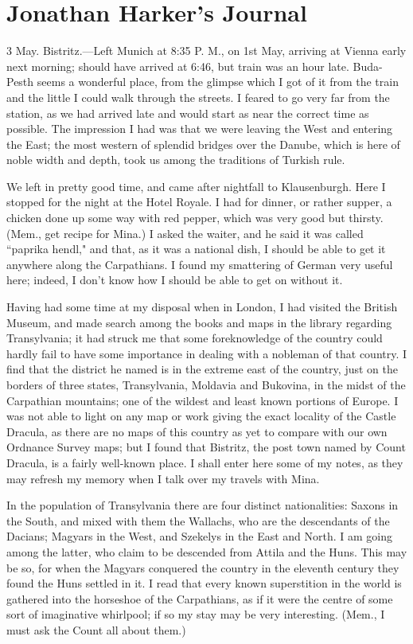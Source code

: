 \chapter{Jonathan Harker's Journal}

3 May. Bistritz.---Left Munich at 8:35 P. M., on 1st May, arriving at Vienna early next morning; should have arrived at 6:46, but train was an hour late. Buda-Pesth seems a wonderful place, from the glimpse which I got of it from the train and the little I could walk through the streets. I feared to go very far from the station, as we had arrived late and would start as near the correct time as possible. The impression I had was that we were leaving the West and entering the East; the most western of splendid bridges over the Danube, which is here of noble width and depth, took us among the traditions of Turkish rule.

We left in pretty good time, and came after nightfall to Klausenburgh. Here I stopped for the night at the Hotel Royale. I had for dinner, or rather supper, a chicken done up some way with red pepper, which was very good but thirsty. (Mem., get recipe for Mina.) I asked the waiter, and he said it was called ``paprika hendl," and that, as it was a national dish, I should be able to get it anywhere along the Carpathians. I found my smattering of German very useful here; indeed, I don't know how I should be able to get on without it.

Having had some time at my disposal when in London, I had visited the British Museum, and made search among the books and maps in the library regarding Transylvania; it had struck me that some foreknowledge of the country could hardly fail to have some importance in dealing with a nobleman of that country. I find that the district he named is in the extreme east of the country, just on the borders of three states, Transylvania, Moldavia and Bukovina, in the midst of the Carpathian mountains; one of the wildest and least known portions of Europe. I was not able to light on any map or work giving the exact locality of the Castle Dracula, as there are no maps of this country as yet to compare with our own Ordnance Survey maps; but I found that Bistritz, the post town named by Count Dracula, is a fairly well-known place. I shall enter here some of my notes, as they may refresh my memory when I talk over my travels with Mina.

In the population of Transylvania there are four distinct nationalities: Saxons in the South, and mixed with them the Wallachs, who are the descendants of the Dacians; Magyars in the West, and Szekelys in the East and North. I am going among the latter, who claim to be descended from Attila and the Huns. This may be so, for when the Magyars conquered the country in the eleventh century they found the Huns settled in it. I read that every known superstition in the world is gathered into the horseshoe of the Carpathians, as if it were the centre of some sort of imaginative whirlpool; if so my stay may be very interesting. (Mem., I must ask the Count all about them.)

